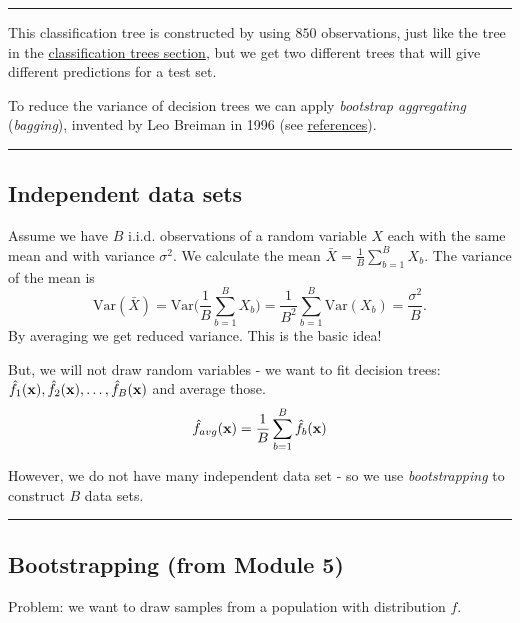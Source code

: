 \documentclass[]{article}
\begin{document}
\begin{center}\rule{0.5\linewidth}{\linethickness}\end{center}

This classification tree is constructed by using \(850\) observations,
just like the tree in the \protect\hyperlink{classtree2}{classification
trees section}, but we get two different trees that will give different
predictions for a test set.

To reduce the variance of decision trees we can apply \emph{bootstrap
aggregating} (\emph{bagging}), invented by Leo Breiman in 1996 (see
\protect\hyperlink{ref}{references}).

\begin{center}\rule{0.5\linewidth}{\linethickness}\end{center}

\hypertarget{independent-data-sets}{%
\subsection{Independent data sets}\label{independent-data-sets}}

Assume we have \(B\) i.i.d. observations of a random variable \(X\) each
with the same mean and with variance \(\sigma^2\). We calculate the mean
\(\bar{X} = \frac{1}{B} \sum_{b=1}^B X_b\). The variance of the mean is
\[\text{Var}(\bar{X}) = \text{Var}\Big(\frac{1}{B}\sum_{b=1}^B X_b \Big) = \frac{1}{B^2} \sum_{b=1}^B \text{Var}(X_b) = \frac{\sigma^2}{B}.\]
By averaging we get reduced variance. This is the basic idea!

But, we will not draw random variables - we want to fit decision trees:
\(\hat{f}_1({\bf x}),\hat{f}_2({\bf x}),\ldots, \hat{f}_B({\bf x})\) and
average those.
\[ \hat{f}_{avg}({\bf x})=\frac{1}{B}\sum_{b=1}^B \hat{f}_b({\bf x})\]

However, we do not have many independent data set - so we use
\emph{bootstrapping} to construct \(B\) data sets.

\begin{center}\rule{0.5\linewidth}{\linethickness}\end{center}

\hypertarget{bootstrapping-from-module-5}{%
\subsection{Bootstrapping (from Module
5)}\label{bootstrapping-from-module-5}}

Problem: we want to draw samples from a population with distribution
\(f\).
\end{document}
